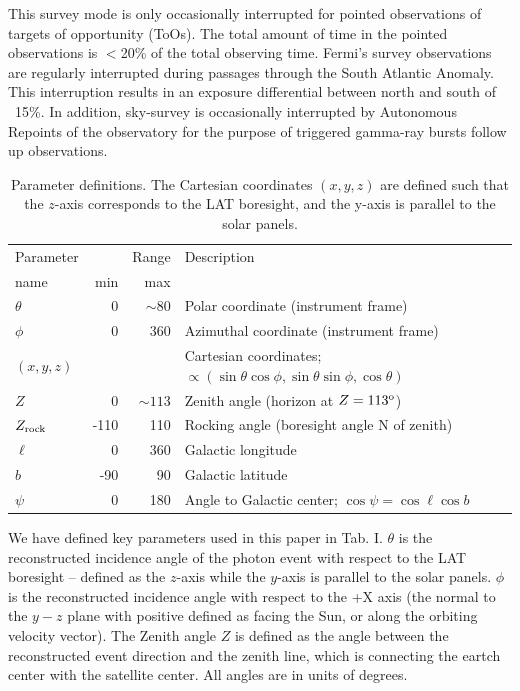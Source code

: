 \documentclass[aps,twocolumn,prd,superscriptaddress,showpacs,nofootinbib,fixfloat]{revtex4}
\newcommand{\degree}{^{\rm o}}
\newcommand{\zrock}{$Z_{\rm rock}$}
\begin{document}
This survey mode is only occasionally interrupted for
pointed observations of targets of opportunity (ToOs). The
total amount of time in the pointed observations is $<$20\%
of the total observing time. Fermi's survey observations are
regularly interrupted during passages through the South
Atlantic Anomaly. This interruption results in an exposure
differential between north and south of ~15\%. In addition,
sky-survey is occasionally interrupted by Autonomous
Repoints of the observatory for the purpose of triggered
gamma-ray bursts follow up observations.

\begin{table}
\begin{center}
  \begin{tabular}{l|rr|l}
    \hline
    Parameter & & Range &  Description\\
    name      & min & max &            \\
    \hline
    $\theta$ &    0 &  $\sim80$ & Polar coordinate (instrument frame) \\
    $\phi$   &    0 &       360 & Azimuthal coordinate (instrument frame) \\
    $(x,y,z)$&      &     & Cartesian coordinates;
    $\propto(\sin\theta\cos\phi, \sin\theta\sin\phi, \cos\theta)$\\
    $Z$      &    0 & $\sim113$ & Zenith angle (horizon at $Z=113\degree$) \\
    \zrock\  & -110 & 110 & Rocking angle (boresight angle N of zenith) \\
    $\ell$   &    0 & 360 & Galactic longitude \\
    $b$      &  -90 &  90 & Galactic latitude \\
    $\psi$   &    0 & 180 & Angle to Galactic center; $\cos\psi=\cos\ell\cos b$ \\
    \hline
  \end{tabular}
  \caption{Parameter definitions. The Cartesian coordinates $(x, y, z)$ are
  defined such that the $z$-axis corresponds to the LAT boresight, and the
  y-axis is parallel to the solar panels.}
  \label{tab:eventRatios}
\end{center}
\end{table}

We have defined key parameters used in this paper in
Tab. I. $\theta$ is the reconstructed
incidence angle of the photon event with respect to the LAT
boresight -- defined as the $z$-axis while the $y$-axis is
parallel to the solar panels. $\phi$ is the reconstructed
incidence angle with respect to the +X axis (the normal to
the $y-z$ plane with positive defined as facing the Sun, or
along the orbiting velocity vector). The Zenith angle $Z$ is
defined as the angle between the reconstructed event
direction and the zenith line, which is connecting the
eartch center with the satellite center. All angles are in
units of degrees.
\end{document}
